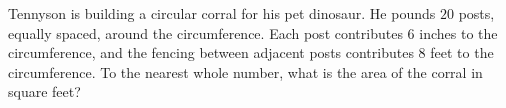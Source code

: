 Tennyson is building a circular corral for his pet dinosaur. He pounds $20$ posts, equally spaced, around the circumference. Each post contributes $6$ inches to the circumference, and the fencing between adjacent posts contributes $8$ feet to the circumference. To the nearest whole number, what is the area of the corral in square feet?
